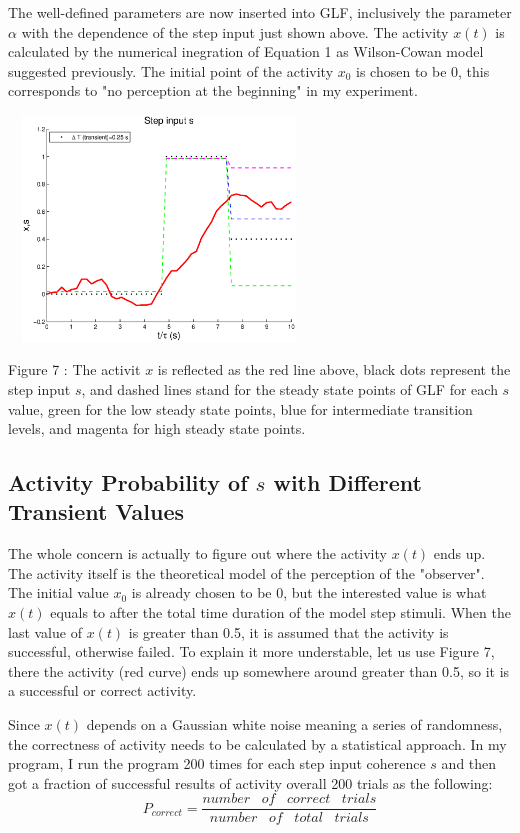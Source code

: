 \documentclass[twocolumn]{article}
\begin{document}
The well-defined parameters are now inserted into GLF, inclusively the parameter $\alpha$ with the dependence of the step input just shown above. The activity $x(t)$ is calculated by the numerical inegration of Equation 1 as Wilson-Cowan model suggested previously. The initial point of the activity $x_0$ is chosen to be 0, this corresponds to "no perception at the beginning" in my experiment.

 \begin{center}
\includegraphics[width=80mm,height=60mm]{my_WC.eps} 
   \begin{footnotesize} Figure 7 : The activit $x$ is reflected as the red line above, black dots represent the step input $s$, and dashed lines stand for the steady state points of GLF for each $s$ value, green for the low steady state points, blue for intermediate transition levels, and magenta for high steady state points.  \end{footnotesize}
\end{center}

\subsection{Activity Probability of $s$ with Different Transient Values}
The whole concern is actually to figure out where the activity $x(t)$ ends up. The activity itself is the theoretical model of the perception of the "observer". The initial value $x_0$ is already chosen to be 0, but the interested value is what $x(t)$ equals to after the total time duration of the model step stimuli. When the last value of $x(t)$ is greater than 0.5, it is assumed that the activity is successful, otherwise failed. To explain it more understable, let us use Figure 7, there the activity (red curve) ends up somewhere around greater than 0.5, so it is a successful or correct activity.

Since $x(t)$ depends on a Gaussian white noise meaning a series of randomness, the correctness of activity needs to be calculated by a  statistical approach. In my program, I run the program 200 times for each step input coherence $s$ and then got a fraction of successful results of activity overall 200 trials as the following:
\begin{equation}
 P_{correct}=\dfrac{number \;\;\;of\;\;\;correct\;\;\;trials}{number\;\;\;of\;\;\;total\;\;\;trials}
\end{equation}
\end{document}
